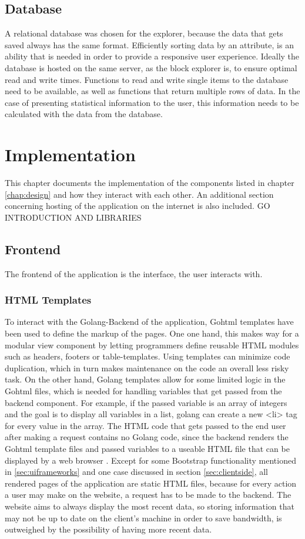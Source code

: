 \section{Database}
A relational database was chosen for the explorer, because the data that gets saved always has the same format. Efficiently sorting data by an attribute, is an ability that is needed in order to provide a responsive user experience. Ideally the database is hosted on the same server, as the block explorer is, to ensure optimal read and write times. Functions to read and write single items to the database need to be available, as well as functions that return multiple rows of data. In the case of presenting statistical information to the user, this information needs to be calculated with the data from the database.

\chapter{Implementation}
This chapter documents the implementation of the components listed in chapter \ref{chap:design} and how they interact with each other. An additional section concerning hosting of the application on the internet is also included. GO INTRODUCTION AND LIBRARIES
\section{Frontend}
The frontend of the application is the interface, the user interacts with. 
\subsection{HTML Templates}
To interact with the Golang-Backend of the application, Gohtml templates \cite{template} have been used to define the markup of the pages. One one hand, this makes way for a modular view component by letting programmers define reusable HTML modules such as headers, footers or table-templates. Using templates can minimize code duplication, which in turn makes maintenance on the code an overall less risky task. On the other hand, Golang templates allow for some limited logic in the Gohtml files, which is needed for handling variables that get passed from the backend component. For example, if the passed variable is an array of integers and the goal is to display all variables in a list, golang can create a new <li> tag for every value in the array. The HTML code that gets passed to the end user after making a request contains no Golang code, since the backend renders the Gohtml template files and passed variables to a useable HTML file that can be displayed by a web browser \cite{httppackage}. Except for some Bootstrap \cite{bootstrap} functionality mentioned in \ref{sec:uiframeworks} and one case discussed in section \ref{sec:clientside}, all rendered pages of the application are static HTML files, because for every action a user may make on the website, a request has to be made to the backend. The website aims to always display the most recent data, so storing information that may not be up to date on the client's machine in order to save bandwidth, is outweighed by the possibility of having more recent data. 

